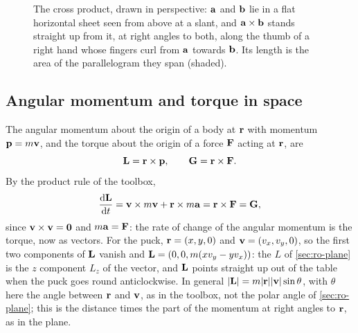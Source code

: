 \begin{figure}[htb]
\centering
{}
\caption{The cross product, drawn in perspective: $\bm{\mathrm{a}}$ and $\bm{\mathrm{b}}$ lie
in a flat horizontal sheet seen from above at a slant, and $\bm{\mathrm{a}}\times
\bm{\mathrm{b}}$ stands straight up from it, at right angles to both, along the
thumb of a right hand whose fingers curl from $\bm{\mathrm{a}}$ towards $\bm{\mathrm{b}}$.
Its length is the area of the parallelogram they span (shaded).}
\label{fig:ro-cross}
\end{figure}

\subsection*{Angular momentum and torque in space}

The angular momentum about the origin of a body at $\bm{\mathrm{r}}$ with momentum
$\bm{\mathrm{p}} = m\bm{\mathrm{v}}$, and the torque about the origin of a force $\bm{\mathrm{F}}$
acting at $\bm{\mathrm{r}}$, are
\begin{equation}
   \bm{\mathrm{L}} = \bm{\mathrm{r}}\times\bm{\mathrm{p}} , \qquad \bm{\mathrm{G}} = \bm{\mathrm{r}}\times\bm{\mathrm{F}} .
   \label{eq:ro-angular}
\end{equation}
By the product rule of the toolbox,
\begin{equation}
   \frac{\mathrm{d}\bm{\mathrm{L}}}{\mathrm{d} t} = \bm{\mathrm{v}}\times m\bm{\mathrm{v}} + \bm{\mathrm{r}}\times m\bm{\mathrm{a}}
   = \bm{\mathrm{r}}\times\bm{\mathrm{F}} = \bm{\mathrm{G}} ,
   \label{eq:ro-torque}
\end{equation}
since $\bm{\mathrm{v}}\times\bm{\mathrm{v}} = \bm{\mathrm{0}}$ and $m\bm{\mathrm{a}} = \bm{\mathrm{F}}$: the rate of
change of the angular momentum is the torque, now as vectors. For the puck,
$\bm{\mathrm{r}} = (x, y, 0)$ and $\bm{\mathrm{v}} = (v_x, v_y, 0)$, so the first two
components of $\bm{\mathrm{L}}$ vanish and $\bm{\mathrm{L}} = (0, 0, m(xv_y - yv_x))$: the
$L$ of \cref{sec:ro-plane} is the $z$ component $L_z$ of the vector, and
$\bm{\mathrm{L}}$ points straight up out of the table when the puck goes round
anticlockwise. In general $\lvert\bm{\mathrm{L}}\rvert = m\lvert\bm{\mathrm{r}}\rvert
\lvert\bm{\mathrm{v}}\rvert\sin\theta$, with $\theta$ here the angle between
$\bm{\mathrm{r}}$ and $\bm{\mathrm{v}}$, as in the toolbox, not the polar angle of
\cref{sec:ro-plane}; this is the distance times the part of the
momentum at right angles to $\bm{\mathrm{r}}$, as in the plane.

